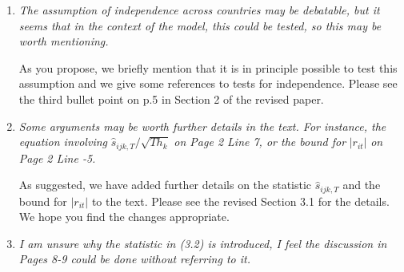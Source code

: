 \documentclass[a4paper,12pt]{article}
\begin{document}
\begin{enumerate}[label=(\arabic*),leftmargin=0.7cm]


\item \textit{The assumption of independence across countries may be debatable, but it seems that in the context of the model, this could be tested, so this may be worth mentioning.}

As you propose, we briefly mention that it is in principle possible to test this assumption and we give some references to tests for independence. Please see the third bullet point on p.5 in Section 2 of the revised paper.

%
%


\item \textit{Some arguments may be worth further details in the text. For instance, the equation involving} $\hat{s}_{ijk,T} / \sqrt{T h_k}$ \textit{on Page 2 Line 7, or the bound for} $|r_{it}|$ \textit{on Page 2 Line -5.}

As suggested, we have added further details on the statistic $\hat{s}_{ijk,T}$ and the bound for $|r_{it}|$ to the text. Please see the revised Section 3.1 for the details. We hope you find the changes appropriate.  


\item \textit{I am unsure why the statistic in (3.2) is introduced, I feel the discussion in Pages 8-9 could be done without referring to it.}


\end{enumerate}
\end{document}
